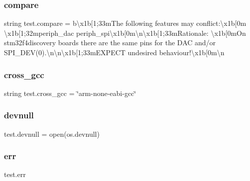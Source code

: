 \subsubsection{\texorpdfstring{compare}{compare}}
{\footnotesize\ttfamily string test.\+compare = b\textquotesingle{}\textbackslash{}x1b\mbox{[}1;33m\+The following features may conflict\+:\textbackslash{}x1b\mbox{[}0m \textbackslash{}x1b\mbox{[}1;32mperiph\+\_\+dac periph\+\_\+spi\textbackslash{}x1b\mbox{[}0m\textbackslash{}n\textbackslash{}x1b\mbox{[}1;33m\+Rationale\+: \textbackslash{}x1b\mbox{[}0m\+On stm32f4discovery boards there are the same pins for the D\+A\+C and/or S\+P\+I\+\_\+\+D\+E\+V(0).\textbackslash{}n\textbackslash{}n\textbackslash{}x1b\mbox{[}1;33m\+E\+X\+P\+E\+C\+T undesired behaviour!\textbackslash{}x1b\mbox{[}0m\textbackslash{}n\textquotesingle{}}

\mbox{\label{namespacetest_a6f76a6282511bb6b2d8e2953ba655cff}} 
\subsubsection{\texorpdfstring{cross\+\_\+gcc}{cross\_gcc}}
{\footnotesize\ttfamily string test.\+cross\+\_\+gcc = \char`\"{}arm-\/none-\/eabi-\/gcc\char`\"{}}

\mbox{\label{namespacetest_a899783dcbb70824df8ffcb5f91af0aa3}} 
\subsubsection{\texorpdfstring{devnull}{devnull}}
{\footnotesize\ttfamily test.\+devnull = open(os.\+devnull)}

\mbox{\label{namespacetest_a135aab9be201f9d1b818716d7cd2476d}} 
\subsubsection{\texorpdfstring{err}{err}}
{\footnotesize\ttfamily test.\+err}

\mbox{\label{namespacetest_af72209c5b4371115dcf115f20e7f119c}} 
